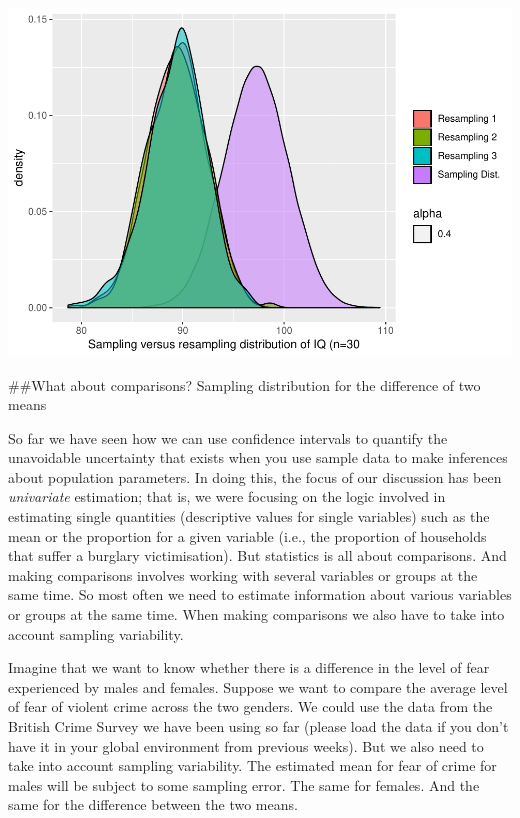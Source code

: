 \documentclass[]{book}
\theoremstyle{definition}
\theoremstyle{definition}
\theoremstyle{definition}
\theoremstyle{remark}
\begin{document}
\includegraphics{05-inference_files/figure-latex/unnamed-chunk-39-1.pdf}

\#\#What about comparisons? Sampling distribution for the difference of
two means

So far we have seen how we can use confidence intervals to quantify the
unavoidable uncertainty that exists when you use sample data to make
inferences about population parameters. In doing this, the focus of our
discussion has been \emph{univariate} estimation; that is, we were
focusing on the logic involved in estimating single quantities
(descriptive values for single variables) such as the mean or the
proportion for a given variable (i.e., the proportion of households that
suffer a burglary victimisation). But statistics is all about
comparisons. And making comparisons involves working with several
variables or groups at the same time. So most often we need to estimate
information about various variables or groups at the same time. When
making comparisons we also have to take into account sampling
variability.

Imagine that we want to know whether there is a difference in the level
of fear experienced by males and females. Suppose we want to compare the
average level of fear of violent crime across the two genders. We could
use the data from the British Crime Survey we have been using so far
(please load the data if you don't have it in your global environment
from previous weeks). But we also need to take into account sampling
variability. The estimated mean for fear of crime for males will be
subject to some sampling error. The same for females. And the same for
the difference between the two means.
\end{document}
